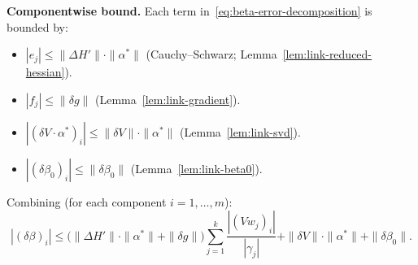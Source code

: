 \begin{lemma}
\textbf{Componentwise bound.}
Each term in~\eqref{eq:beta-error-decomposition} is bounded by:
\begin{itemize}
  \item $|e_j| \leq \|\Delta H'\| \cdot \|\alpha^*\|$
    (Cauchy--Schwarz; Lemma~\ref{lem:link-reduced-hessian}).
  \item $|f_j| \leq \|\delta g\|$
    (Lemma~\ref{lem:link-gradient}).
  \item $|(\delta V \cdot \alpha^*)_i|
    \leq \|\delta V\| \cdot \|\alpha^*\|$
    (Lemma~\ref{lem:link-svd}).
  \item $|(\delta\beta_0)_i| \leq \|\delta\beta_0\|$
    (Lemma~\ref{lem:link-beta0}).
\end{itemize}
Combining (for each component $i = 1, \ldots, m$):
\begin{equation}\label{eq:beta-certification-bound}
  |(\delta\beta)_i|
  \leq \bigl(\|\Delta H'\| \cdot \|\alpha^*\| + \|\delta g\|\bigr)
       \sum_{j=1}^{k} \frac{|(Vw_j)_i|}{|\gamma_j|}
  + \|\delta V\| \cdot \|\alpha^*\|
  + \|\delta\beta_0\|.
\end{equation}


\end{lemma}
